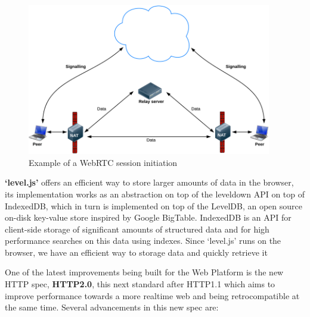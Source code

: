 \documentclass{./llncs2e/llncs}
\begin{document}
\begin{figure}[h!]
  \centering
  \includegraphics[width=0.95\textwidth]{img/webrtc.png}
  \caption{Example of a WebRTC session initiation}
  \label{fig:webrtc}
\end{figure}

% 
% 


\textbf{`level.js'} offers an efficient way to store larger amounts of data in the browser, its implementation works as an abstraction on top of the leveldown API on top of IndexedDB\cite{Recommendation2013}, which in turn is implemented on top of the LevelDB\cite{JeffreyDean;SanjayGhemawat}, an open source on-disk key-value store inspired by Google BigTable. IndexedDB is an API for client-side storage of significant amounts of structured data and for high performance searches on this data using indexes. Since `level.js' runs on the browser, we have an efficient way to storage data and quickly retrieve it

One of the latest improvements being built for the Web Platform is the new HTTP spec, \textbf{HTTP2.0}\cite{Thomson2013}, this next standard after HTTP1.1 which aims to improve performance towards a more realtime web and being retrocompatible at the same time. Several advancements in this new spec are:
\end{document}
